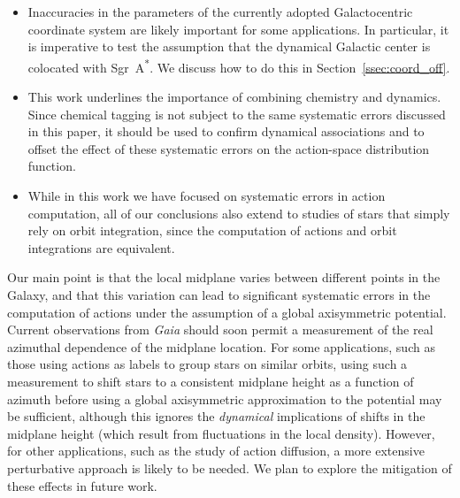 \documentclass[twocolumn]{aastex62}
\newcommand{\sgra}{Sgr~A\textsuperscript{*}}
\begin{document}
\begin{itemize}
\item Inaccuracies in the parameters of the currently adopted
Galactocentric coordinate system are likely important for some
applications. In particular, it is imperative to test the assumption that the
dynamical Galactic center is colocated with \sgra{}. We discuss how to
do this in Section~\ref{ssec:coord_off}.

\item This work underlines the importance of combining chemistry and dynamics.
Since chemical tagging \citep{2002ARA&A..40..487F} is not subject to the same systematic errors discussed in this paper, it should be used to confirm dynamical associations and to offset the effect of these systematic errors on the action-space distribution function.

\item While in this work we have focused on systematic errors in action
computation, all of our conclusions also extend to studies of stars that
simply rely on orbit integration, since the computation of actions and orbit
integrations are equivalent.

\end{itemize}

Our main point is that the local midplane varies between different points in
the Galaxy, and that this variation can lead to significant systematic errors
in the computation of actions under the assumption of a global axisymmetric
potential. 
Current observations from \textit{Gaia} should soon permit a measurement of the
real azimuthal dependence of the midplane location. For some applications,
such as those using actions as labels to group stars on similar orbits, using
such a measurement to shift stars to a consistent midplane height as a
function of azimuth before using a global axisymmetric approximation to the
potential may be sufficient, although this ignores the \emph{dynamical}
implications of shifts in the midplane height (which result from fluctuations
in the local density). However, for other applications, such as the study of
action diffusion,
a more extensive perturbative approach is likely to be needed. We plan to explore the
mitigation of these effects in future work.
\end{document}
